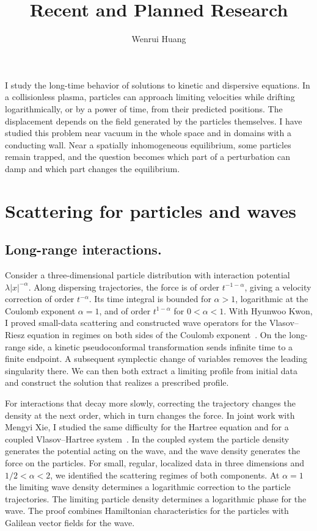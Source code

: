 \documentclass[reqno,10pt,letterpaper]{amsart}
\title{Recent and Planned Research}
\author{Wenrui Huang}
\date{}
\numberwithin{equation}{section}
\begin{document}
\maketitle

I study the long-time behavior of solutions to kinetic and dispersive equations. In a collisionless plasma, particles can approach limiting velocities while drifting logarithmically, or by a power of time, from their predicted positions. The displacement depends on the field generated by the particles themselves. I have studied this problem near vacuum in the whole space and in domains with a conducting wall. Near a spatially inhomogeneous equilibrium, some particles remain trapped, and the question becomes which part of a perturbation can damp and which part changes the equilibrium. 

\section{Scattering for particles and waves}

\subsection{Long-range interactions.}
Consider a three-dimensional particle distribution with interaction potential $\lambda |x|^{-\alpha}$. Along dispersing trajectories, the force is of order $t^{-1-\alpha}$, giving a velocity correction of order $t^{-\alpha}$. Its time integral is bounded for $\alpha>1$, logarithmic at the Coulomb exponent $\alpha=1$, and of order $t^{1-\alpha}$ for $0<\alpha<1$. With Hyunwoo Kwon, I proved small-data scattering and constructed wave operators for the Vlasov--Riesz equation in regimes on both sides of the Coulomb exponent~\cite{HK24}. On the long-range side, a kinetic pseudoconformal transformation sends infinite time to a finite endpoint. A subsequent symplectic change of variables removes the leading singularity there. We can then both extract a limiting profile from initial data and construct the solution that realizes a prescribed profile.

For interactions that decay more slowly, correcting the trajectory changes the density at the next order, which in turn changes the force. In joint work with Mengyi Xie, I studied the same difficulty for the Hartree equation and for a coupled Vlasov--Hartree system~\cite{HX26a,HX26b}. In the coupled system the particle density generates the potential acting on the wave, and the wave density generates the force on the particles. For small, regular, localized data in three dimensions and $1/2<\alpha<2$, we identified the scattering regimes of both components. At $\alpha=1$ the limiting wave density determines a logarithmic correction to the particle trajectories. The limiting particle density determines a logarithmic phase for the wave. The proof combines Hamiltonian characteristics for the particles with Galilean vector fields for the wave.
\end{document}
